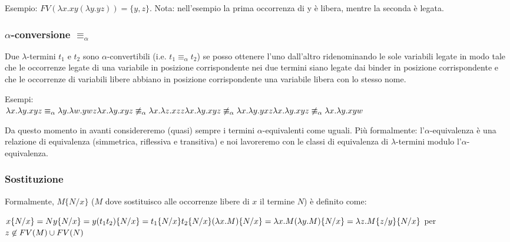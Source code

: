 \documentclass{article}
\begin{document}
\bigskip

Esempio: $FV(\lambda x.xy(\lambda y.yz)) = \{y, z\}$. Nota: nell'esempio la prima occorrenza di y è libera, mentre la seconda è legata.

\subsubsection{$\alpha$-conversione $\equiv_\alpha$}
Due $\lambda$-termini $t_1$ e $t_2$ sono $\alpha$-convertibili (i.e. $t_1\equiv_\alpha t_2$) se posso ottenere l'uno dall'altro ridenominando le sole variabili legate in modo tale che le occorrenze legate di una variabile in posizione corrispondente nei due termini siano legate dai binder in posizione corrispondente e che le occorrenze di variabili libere abbiano in posizione corrispondente una variabile libera con lo
stesso nome.

\bigskip

\noindent Esempi: \\
$
\lambda x.\lambda y.xyz \equiv_\alpha \lambda y.\lambda w.ywz \\
\lambda x.\lambda y.xyz \not\equiv_\alpha \lambda x.\lambda z.xzz \\
\lambda x.\lambda y.xyz \not\equiv_\alpha \lambda x.\lambda y.yxz \\
\lambda x.\lambda y.xyz \not\equiv_\alpha \lambda x.\lambda y.xyw
$

\bigskip

Da questo momento in avanti considereremo (quasi) sempre i termini $\alpha$-equivalenti come uguali. Più formalmente: l'$\alpha$-equivalenza è una relazione di equivalenza (simmetrica, riflessiva e transitiva) e noi lavoreremo con le classi di equivalenza di $\lambda$-termini modulo l'$\alpha$-equivalenza.

\subsubsection{Sostituzione}
Formalmente, $M\{N/x\}$ ($M$ dove sostituisco alle occorrenze libere di $x$ il termine $N$) è definito come:

\bigskip

\noindent $
x\{N/x\} = N  \\
y\{N/x\} = y  \\
(t_1t_2)\{N/x\} = t_1\{N/x\}t_2\{N/x\}  \\
(\lambda x.M)\{N/x\} = \lambda x.M  \\
(\lambda y.M)\{N/x\} = \lambda z.M\{z/y\}\{N/x\}$ per $z \not\in FV(M) \cup FV(N)\\
$
\end{document}
